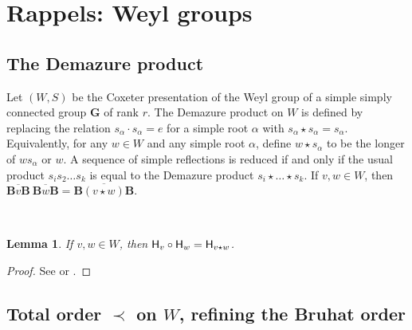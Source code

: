 \documentclass[sn-mathphys-num]{sn-jnl}%
\newcommand{\sH}{{\sf H}}
\newcommand{\bg}{\mathbf G}
\newcommand{\fb}{\mathbf B}
\newtheorem{lemma}[theorem]{Lemma}
\theoremstyle{definition}
\begin{document}
\section{Rappels: Weyl groups}\label{sec:Weylgroups}

\subsection{The Demazure product}\label{subsec:Demazureproduct}

Let $(W,S)$ be the Coxeter presentation of the Weyl group of a simple simply connected group $ \bg$ of rank $r$. 
The Demazure product on $W$ is defined by replacing the relation $s_{\alpha}\cdot s_{\alpha}=e$ for a simple root $\alpha$ with $s_{\alpha}\star s_{\alpha}=s_{\alpha}$. Equivalently, for any $w\in W$ and any simple root $\alpha$, define $w\star s_{\alpha}$ to be the longer of $ws_{\alpha}$ or $w$. A sequence of simple reflections is reduced if and only if the usual product $s_{i}s_{2}\dots s_{k}$ is equal to the Demazure product $s_{i}\star \dots \star s_{{k}}$.
If $v,w\in W$, then $\overline{\fb v\fb}~\overline{\fb w\fb}=\overline{\fb (v\star w)\fb}$.%

\

\begin{lemma}\label{lem:Hwstar}
    If $v,w\in W$, then ${\sH}_v\circ {\sH}_w={\sH}_{v\star w}$.
\end{lemma}
\begin{proof}
    See \cite[1.3., Corollary and Theorem 3.1]{CPS} or \cite[Proposition 2.2.5]{WvdKTata}.
\end{proof}

\subsection{Total order $\prec$ on $W$, refining the Bruhat order}\label{subsec:totalorderonW}
\end{document}
